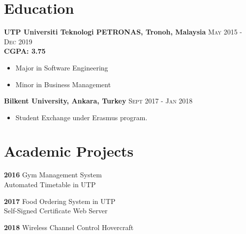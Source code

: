 \documentclass[English]{cv-style}
\begin{document}
\section{Education}
\vspace{-0.3cm}
\textbf{UTP Universiti Teknologi PETRONAS, Tronoh, Malaysia}
    \quad \quad \quad \quad \quad \quad \quad \quad \quad \quad
\textsc{May 2015 - Dec 2019} \\
    \quad \quad \quad \quad \quad \quad  
\textbf{CGPA: 3.75} \vspace{-0.15cm}
    \begin{itemize}[noitemsep]
        \item Major in Software Engineering
        \item Minor in Business Management
    \end{itemize}
\textbf{Bilkent University, Ankara, Turkey}
    \quad \quad \quad \quad \quad \quad \quad \quad \quad
    \quad \quad \quad \quad \quad \quad \quad \quad \quad
\textsc{ Sept 2017 - Jan 2018} \\
 \vspace{-0.15cm}
    \begin{itemize}[noitemsep]
        \item Student Exchange under Erasmus program.
    \end{itemize}
\section{Academic Projects}
\vspace{-0.2cm}
\textbf{2016}   
    \vspace{0.1mm} {\quad \quad Gym Management System}\\
    \vspace{0.1mm} {\quad \quad \quad \quad Automated Timetable in UTP} 

\textbf{2017}
    \vspace{0.1mm} {\quad \quad Food Ordering System in UTP} \\
    \vspace{0.1mm} {\quad \quad \quad \quad Self-Signed Certificate Web Server}
    
\textbf{2018}
    \vspace{0.1mm} {\quad \quad Wireless Channel Control Hovercraft}
    
\end{document}
